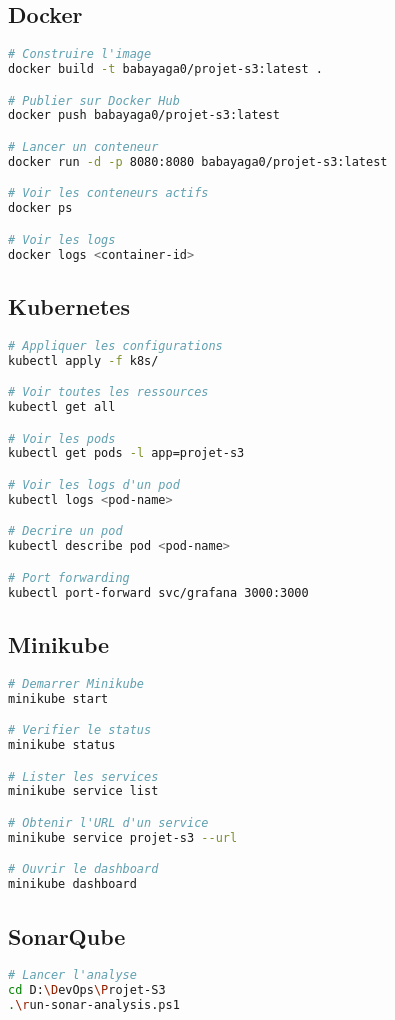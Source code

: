 \documentclass[12pt,a4paper]{article}
\begin{document}
\subsection{Docker}
\begin{lstlisting}[language=bash]
# Construire l'image
docker build -t babayaga0/projet-s3:latest .

# Publier sur Docker Hub
docker push babayaga0/projet-s3:latest

# Lancer un conteneur
docker run -d -p 8080:8080 babayaga0/projet-s3:latest

# Voir les conteneurs actifs
docker ps

# Voir les logs
docker logs <container-id>
\end{lstlisting}

\subsection{Kubernetes}
\begin{lstlisting}[language=bash]
# Appliquer les configurations
kubectl apply -f k8s/

# Voir toutes les ressources
kubectl get all

# Voir les pods
kubectl get pods -l app=projet-s3

# Voir les logs d'un pod
kubectl logs <pod-name>

# Decrire un pod
kubectl describe pod <pod-name>

# Port forwarding
kubectl port-forward svc/grafana 3000:3000
\end{lstlisting}

\subsection{Minikube}
\begin{lstlisting}[language=bash]
# Demarrer Minikube
minikube start

# Verifier le status
minikube status

# Lister les services
minikube service list

# Obtenir l'URL d'un service
minikube service projet-s3 --url

# Ouvrir le dashboard
minikube dashboard
\end{lstlisting}

\subsection{SonarQube}
\begin{lstlisting}[language=bash]
# Lancer l'analyse
cd D:\DevOps\Projet-S3
.\run-sonar-analysis.ps1
\end{lstlisting}
\end{document}
